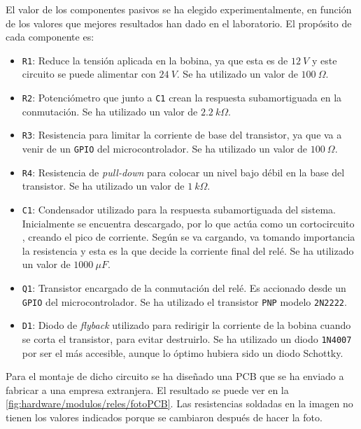 El valor de los componentes pasivos se ha elegido experimentalmente, en función de los valores que mejores resultados han dado en el laboratorio. El propósito de cada componente es:
\begin{itemize}
    \item \texttt{R1}: Reduce la tensión aplicada en la bobina, ya que esta es de $12\ V$ y este circuito se puede alimentar con $24\ V$. Se ha utilizado un valor de $100\ \Omega$.
    \item \texttt{R2}: Potenciómetro que junto a \texttt{C1} crean la respuesta subamortiguada en la conmutación. Se ha utilizado un valor de $2.2\ k\Omega$.
    \item \texttt{R3}: Resistencia para limitar la corriente de base del transistor, ya que va a venir de un \texttt{GPIO} del microcontrolador. Se ha utilizado un valor de $100\ \Omega$.
    \item \texttt{R4}: Resistencia de \textit{pull-down} para colocar un nivel bajo débil en la base del transistor. Se ha utilizado un valor de $1\ k\Omega$.
    \item \texttt{C1}: Condensador utilizado para la respuesta subamortiguada del sistema. Inicialmente se encuentra descargado, por lo que actúa como un cortocircuito , creando el pico de corriente. Según se va cargando, va tomando importancia la resistencia y esta es la que decide la corriente final del relé. Se ha utilizado un valor de $1000\ \mu F$.
    \item \texttt{Q1}: Transistor encargado de la conmutación del relé. Es accionado desde un \texttt{GPIO} del microcontrolador. Se ha utilizado el transistor \texttt{PNP} modelo \texttt{2N2222}. 
    \item \texttt{D1}: Diodo de \textit{flyback} utilizado para redirigir la corriente de la bobina cuando se corta el transistor, para evitar destruirlo. Se ha utilizado un diodo \texttt{1N4007} por ser el más accesible, aunque lo óptimo hubiera sido un diodo Schottky.
\end{itemize}

Para el montaje de dicho circuito se ha diseñado una PCB que se ha enviado a fabricar a una empresa extranjera. El resultado se puede ver en la \autoref{fig:hardware/modulos/reles/fotoPCB}. Las resistencias soldadas en la imagen no tienen los valores indicados porque se cambiaron después de hacer la foto.

